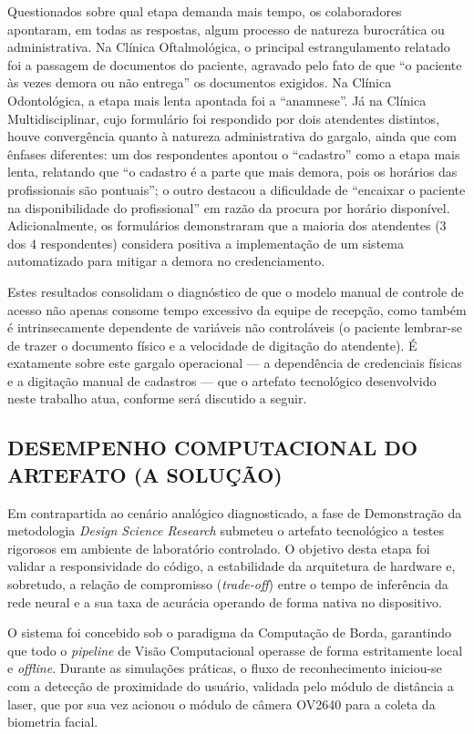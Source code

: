 Questionados sobre qual etapa demanda mais tempo, os colaboradores apontaram, em todas as respostas, algum processo de natureza burocrática ou administrativa. Na Clínica Oftalmológica, o principal estrangulamento relatado foi a passagem de documentos do paciente, agravado pelo fato de que ``o paciente às vezes demora ou não entrega'' os documentos exigidos. Na Clínica Odontológica, a etapa mais lenta apontada foi a ``anamnese''. Já na Clínica Multidisciplinar, cujo formulário foi respondido por dois atendentes distintos, houve convergência quanto à natureza administrativa do gargalo, ainda que com ênfases diferentes: um dos respondentes apontou o ``cadastro'' como a etapa mais lenta, relatando que ``o cadastro é a parte que mais demora, pois os horários das profissionais são pontuais''; o outro destacou a dificuldade de ``encaixar o paciente na disponibilidade do profissional'' em razão da procura por horário disponível. Adicionalmente, os formulários demonstraram que a maioria dos atendentes (3 dos 4 respondentes) considera positiva a implementação de um sistema automatizado para mitigar a demora no credenciamento.  

Estes resultados consolidam o diagnóstico de que o modelo manual de controle de acesso não apenas consome tempo excessivo da equipe de recepção, como também é intrinsecamente dependente de variáveis não controláveis (o paciente lembrar-se de trazer o documento físico e a velocidade de digitação do atendente). É exatamente sobre este gargalo operacional — a dependência de credenciais físicas e a digitação manual de cadastros — que o artefato tecnológico desenvolvido neste trabalho atua, conforme será discutido a seguir.

\subsection{DESEMPENHO COMPUTACIONAL DO ARTEFATO (A SOLUÇÃO)}
\label{desempenho-computacional}

Em contrapartida ao cenário analógico diagnosticado, a fase de Demonstração da metodologia \textit{Design Science Research} submeteu o artefato tecnológico a testes rigorosos em ambiente de laboratório controlado. O objetivo desta etapa foi validar a responsividade do código, a estabilidade da arquitetura de hardware e, sobretudo, a relação de compromisso (\textit{trade-off}) entre o tempo de inferência da rede neural e a sua taxa de acurácia operando de forma nativa no dispositivo.  

O sistema foi concebido sob o paradigma da Computação de Borda, garantindo que todo o \textit{pipeline} de Visão Computacional operasse de forma estritamente local e \textit{offline}. Durante as simulações práticas, o fluxo de reconhecimento iniciou-se com a detecção de proximidade do usuário, validada pelo módulo de distância a laser, que por sua vez acionou o módulo de câmera OV2640 para a coleta da biometria facial.  

